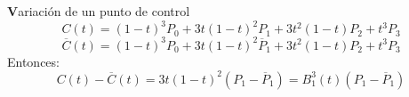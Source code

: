 \documentclass[ebook,oneside]{memoir}
\begin{document}
%
%
%
%
%
%
%
{\textbf Variaci\'{o}n de un punto de control}
$$C(t)=(1-t)^3P_0+3t(1-t)^2P_1+3t^2(1-t)P_2+t^3P_3$$
$$\overline{C}(t)=(1-t)^3P_0+3t(1-t)^2\overline{P}_1+3t^2(1-t)P_2+t^3P_3$$
Entonces:
$$C(t)-\overline{C}(t)=3t(1-t)^2(P_1-\overline{P}_1)=B_1^3(t)(P_1-\overline{P}_1)$$
\end{document}
